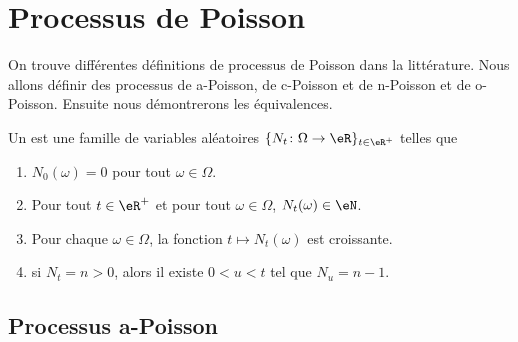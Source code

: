 
\section{Processus de Poisson}
\label{SecHxbtzQ}

On trouve différentes définitions de processus de Poisson dans la littérature. Nous allons définir des processus de a-Poisson, de c-Poisson et de n-Poisson et de o-Poisson. Ensuite nous démontrerons les équivalences.

\begin{definition}		\label{DEFooEVRIooZQJRSZ}
	Un  est une famille de variables aléatoires \( \{ N_t\colon \Omega\to \eR \}_{t\in \eR^+}\) telles que
	\begin{enumerate}
		\item
		      \( N_0(\omega)=0\) pour tout \( \omega\in \Omega\).
		\item
		      Pour tout \( t\in \eR^+\) et pour tout \( \omega\in \Omega\), \( N_t(\omega)\in \eN\).
		\item
		      Pour chaque \( \omega\in \Omega\), la fonction \( t\mapsto N_t(\omega)\) est croissante.
		\item
		      si \( N_t=n>0\), alors il existe \( 0<u<t\) tel que \( N_u=n-1\).
	\end{enumerate}
\end{definition}


\subsection{Processus a-Poisson}

